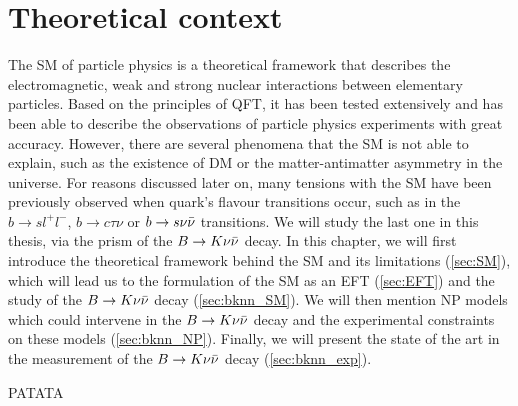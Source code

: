 \chapter{Theoretical context} \label{ch:theory}


The \gls{SM} of particle physics is a theoretical framework that describes the electromagnetic, weak and strong nuclear interactions between elementary particles. 
Based on the principles of \gls{QFT}, it has been tested extensively and has been able to describe the observations of particle physics experiments with great accuracy. 
However, there are several phenomena that the \gls{SM} is not able to explain, such as the existence of \gls{DM} or the matter-antimatter asymmetry in the universe. 
For reasons discussed later on, many tensions with the \gls{SM} have been previously observed when quark's flavour transitions occur, such as in the $b \to s l^+ l^-$, $b \to c \tau \nu$ or $b \to s \nu \Bar{\nu}$ transitions. 
We will study the last one in this thesis, via the prism of the $B \to K \nu \Bar{\nu}$ decay.
In this chapter, we will first introduce the theoretical framework behind the \gls{SM} and its limitations (\cref{sec:SM}), which will lead us to the formulation of the \gls{SM} as an \gls{EFT} (\cref{sec:EFT}) and the study of the $B \to K \nu \Bar{\nu}$ decay (\ref{sec:bknn_SM}).
We will then mention \gls{NP} models which could intervene in the $B \to K \nu \Bar{\nu}$ decay and the experimental constraints on these models (\ref{sec:bknn_NP}).
Finally, we will present the state of the art in the measurement of the $B \to K \nu \Bar{\nu}$ decay (\ref{sec:bknn_exp}).











PATATA

\cite{kolmogorov}